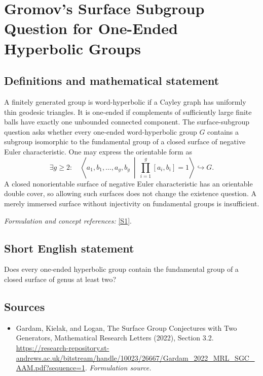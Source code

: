 \documentclass[11pt]{article}
\begin{document}
\section*{\texorpdfstring{Gromov's Surface Subgroup Question for One-Ended Hyperbolic Groups}{Gromov's Surface Subgroup Question for One-Ended Hyperbolic Groups}}\label{323}
\subsection{Definitions and mathematical statement}
A finitely generated group is word-hyperbolic if a Cayley graph has uniformly thin geodesic triangles. It is one-ended if complements of sufficiently large finite balls have exactly one unbounded connected component. The surface-subgroup question asks whether every one-ended word-hyperbolic group $G$ contains a subgroup isomorphic to the fundamental group of a closed surface of negative Euler characteristic. One may express the orientable form as
\[
 \exists g\ge2:\quad
 \left\langle a_1,b_1,\ldots,a_g,b_g\ \middle|\
 \prod_{i=1}^g[a_i,b_i]=1\right\rangle\hookrightarrow G.
\]
A closed nonorientable surface of negative Euler characteristic has an orientable double cover, so allowing such surfaces does not change the existence question. A merely immersed surface without injectivity on fundamental groups is insufficient.
\par\smallskip\textit{Formulation and concept references:} \href{https://research-repository.st-andrews.ac.uk/bitstream/handle/10023/26667/Gardam_2022_MRL_SGC_AAM.pdf?sequence=1}{[S1]}.

\subsection{Short English statement}
Does every one-ended hyperbolic group contain the fundamental group of a closed surface of genus at least two?
\subsection{Sources}
\begin{itemize}
\item[S1]Gardam, Kielak, and Logan, The Surface Group Conjectures with Two Generators, Mathematical Research Letters (2022), Section 3.2.
\url{https://research-repository.st-andrews.ac.uk/bitstream/handle/10023/26667/Gardam_2022_MRL_SGC_AAM.pdf?sequence=1}.
\textit{Formulation source.}
\end{itemize}
\end{document}
